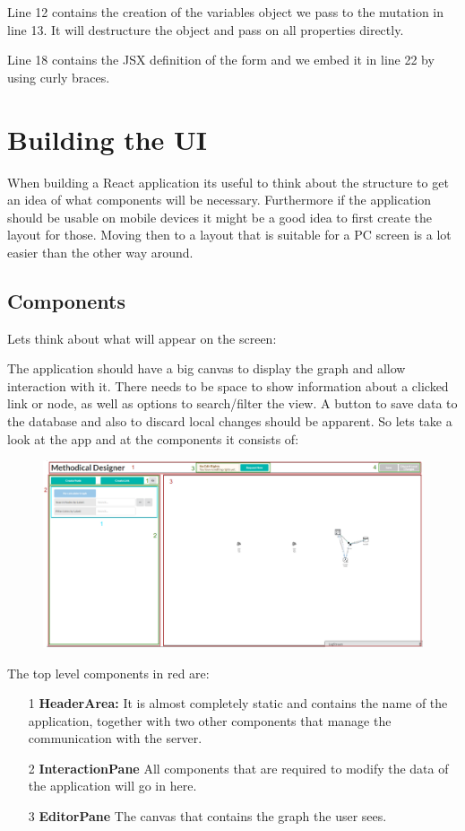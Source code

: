 Line 12 contains the creation of the variables object we pass to the mutation in line 13. It will destructure the object and pass on all properties directly.

Line 18 contains the JSX definition of the form and we embed it in line 22 by using curly braces.

\section{Building the UI}
When building a React application its useful to think about the structure to get an idea of what components will be necessary. Furthermore if the application should be usable on mobile devices it might be a good idea to first create the layout for those. Moving then to a layout that is suitable for a PC screen is a lot easier than the other way around.

\subsection{Components}
Lets think about what will appear on the screen:

The application should have a big canvas to display the graph and allow interaction with it. There needs to be space to show information about a clicked link or node, as well as options to search/filter the view. A button to save data to the database and also to discard local changes should be apparent. So lets take a look at the app and at the components it consists of:
\begin{figure}[H]
\includegraphics[scale=.46]{Bilder/Layout.png}
\end{figure}
The top level components in red are:
\begin{itemize}
\item[1] \textbf{HeaderArea:} It is almost completely static and contains the name of the application, together with two other components that manage the communication with the server.
\item[2] \textbf{InteractionPane} All components that are required to modify the data of the application will go in here.
\item[3] \textbf{EditorPane} The canvas that contains the graph the user sees.
\end{itemize}

